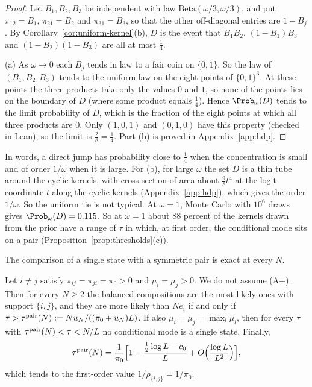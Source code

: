 \begin{proof}
Let $B_1,B_2,B_3$ be independent with law $\mathrm{Beta}(\omega/3,\omega/3)$,
and put $\pi_{12}=B_1$, $\pi_{21}=B_2$ and $\pi_{31}=B_3$, so that the other
off-diagonal entries are $1-B_j$. By Corollary~\ref{cor:uniform-kernel}(b),
$D$ is the event that $B_1B_2$, $(1-B_1)B_3$ and $(1-B_2)(1-B_3)$ are all at
most $\frac14$.

(a) As $\omega\to0$ each $B_j$ tends in law to a fair coin on $\{0,1\}$. So
the law of $(B_1,B_2,B_3)$ tends to the uniform law on the eight points of
$\{0,1\}^3$. At these points the three products take only the values $0$ and
$1$, so none of the points lies on the boundary of $D$ (where some product
equals $\frac14$). Hence $\Prob_\omega(D)$ tends to the limit probability of
$D$, which is the fraction of the eight points at which all three products are
$0$. Only $(1,0,1)$ and $(0,1,0)$ have this property (checked in Lean), so the
limit is $\frac28=\frac14$. Part (b) is proved in Appendix~\ref{app:hdp}.
\end{proof}

In words, a direct jump has probability close to $\frac14$ when the
concentration is small and of order $1/\omega$ when it is large. For (b), for
large $\omega$ the set $D$ is a thin tube around the cyclic kernels, with
cross-section of area about $\frac98t^4$ at the logit coordinate $t$ along the
cyclic kernels (Appendix~\ref{app:hdp}), which gives the order $1/\omega$. So
the uniform tie is not typical. At $\omega=1$, Monte Carlo with $10^6$ draws
gives $\Prob_\omega(D)=0.115$. So at $\omega=1$ about $88$ percent of the kernels drawn from the
prior have a range of $\tau$ in which, at first order, the conditional mode sits on a pair
(Proposition~\ref{prop:thresholds}(c)).

The comparison of a single state with a symmetric pair is exact at every $N$.

\begin{corollary}\label{cor:sticky-pair}
Let $i\ne j$ satisfy $\pi_{ij}=\pi_{ji}=\pi_0>0$ and $\mu_i=\mu_j>0$. We do not
assume \textup{(A+)}. Then for every $N\ge2$ the balanced compositions are the
most likely ones with support $\{i,j\}$, and they are more likely than $Ne_i$
if and only if $\tau>\tau^{\rm pair}(N):=Nu_N/((\pi_0+u_N)L)$. If also
$\mu_i=\mu_j=\max_l\mu_l$, then for every $\tau$ with
$\tau^{\rm pair}(N)<\tau<N/L$ no conditional mode is a single state. Finally,
\[
 \tau^{\rm pair}(N)=\frac1{\pi_0}\Bigl[1-\frac{\frac12\log L-c_0}{L}
 +O\Bigl(\frac{\log L}{L^2}\Bigr)\Bigr],
\]
which tends to the first-order value $1/\rho_{\{i,j\}}=1/\pi_0$.
\end{corollary}

